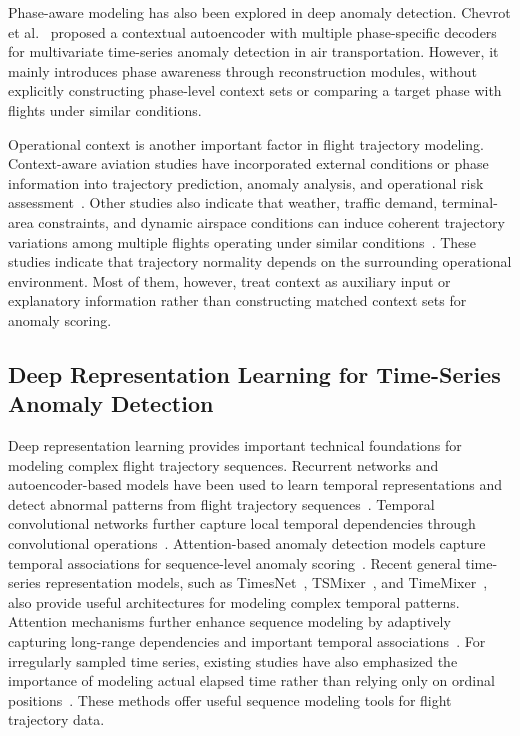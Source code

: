 \documentclass[iicol,pdflatex,sn-basic,Numbered]{sn-jnl}%
\theoremstyle{thmstyleone}%
\theoremstyle{thmstyletwo}%
\theoremstyle{thmstylethree}%
\begin{document}
Phase-aware modeling has also been explored in deep anomaly detection.
Chevrot et al.~\cite{chevrot2022cae} proposed a contextual autoencoder with multiple phase-specific decoders for multivariate time-series anomaly detection in air transportation. 
However, it mainly introduces phase awareness through reconstruction modules, without explicitly constructing phase-level context sets or comparing a target phase with flights under similar conditions.

Operational context is another important factor in flight trajectory modeling.
Context-aware aviation studies have incorporated external conditions or phase information into trajectory prediction, anomaly analysis, and operational risk assessment~\cite{aerospace9020091,app12031295,aerospace13030209,coelho2023analytics,choi2023stochastic}. 
Other studies also indicate that weather, traffic demand, terminal-area constraints, and dynamic airspace conditions can induce coherent trajectory variations among multiple flights operating under similar conditions~\cite{yang2024optimising,chen2025impact,sydorenko2025optimizing}.
These studies indicate that trajectory normality depends on the surrounding operational environment.
Most of them, however, treat context as auxiliary input or explanatory information rather than constructing matched context sets for anomaly scoring.

\subsection{Deep Representation Learning for Time-Series Anomaly Detection}

Deep representation learning provides important technical foundations for modeling complex flight trajectory sequences.
Recurrent networks and autoencoder-based models have been used to learn temporal representations and detect abnormal patterns from flight trajectory sequences~\cite{chevrot2022cae,LUO2024103840}. 
Temporal convolutional networks further capture local temporal dependencies through convolutional operations~\cite{HUANG2025103478}. 
Attention-based anomaly detection models capture temporal associations for sequence-level anomaly scoring~\cite{xu2022anomalytransformer}. 
Recent general time-series representation models, such as TimesNet~\cite{wu2023timesnet}, TSMixer~\cite{chen2023tsmixer}, and TimeMixer~\cite{wang2024timemixer}, also provide useful architectures for modeling complex temporal patterns.
Attention mechanisms further enhance sequence modeling by adaptively capturing long-range dependencies and important temporal associations~\cite{xu2022anomalytransformer}. 
For irregularly sampled time series, existing studies have also emphasized the importance of modeling actual elapsed time rather than relying only on ordinal positions~\cite{kreindler2016effects,li2020learning,kidger2020neuralcde,shukla2021mtnet,braun2022sampling}. 
These methods offer useful sequence modeling tools for flight trajectory data.
\end{document}
